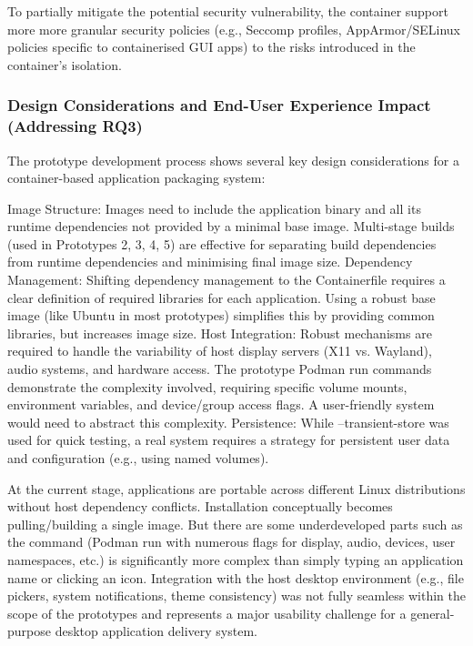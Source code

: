 \documentclass[journal,onecolumn]{IEEEtran}
\begin{document}
To partially mitigate the potential security vulnerability, the container support more more granular security policies (e.g., Seccomp profiles, AppArmor/SELinux policies specific to containerised GUI apps) to the risks introduced in the container's isolation.

\subsubsection{Design Considerations and End-User Experience Impact (Addressing RQ3)}

The prototype development process shows several key design considerations for a container-based application packaging system:

Image Structure: Images need to include the application binary and all its runtime dependencies not provided by a minimal base image. Multi-stage builds (used in Prototypes 2, 3, 4, 5) are effective for separating build dependencies from runtime dependencies and minimising final image size.
Dependency Management: Shifting dependency management to the Containerfile requires a clear definition of required libraries for each application. Using a robust base image (like Ubuntu in most prototypes) simplifies this by providing common libraries, but increases image size.
Host Integration: Robust mechanisms are required to handle the variability of host display servers (X11 vs. Wayland), audio systems, and hardware access. The prototype Podman run commands demonstrate the complexity involved, requiring specific volume mounts, environment variables, and device/group access flags. A user-friendly system would need to abstract this complexity.
Persistence: While --transient-store was used for quick testing, a real system requires a strategy for persistent user data and configuration (e.g., using named volumes).

At the current stage,  applications are portable across different Linux distributions without host dependency conflicts. Installation conceptually becomes pulling/building a single image. But there are some underdeveloped parts such as the command (Podman run with numerous flags for display, audio, devices, user namespaces, etc.) is significantly more complex than simply typing an application name or clicking an icon. Integration with the host desktop environment (e.g., file pickers, system notifications, theme consistency) was not fully seamless within the scope of the prototypes and represents a major usability challenge for a general-purpose desktop application delivery system.
\end{document}
